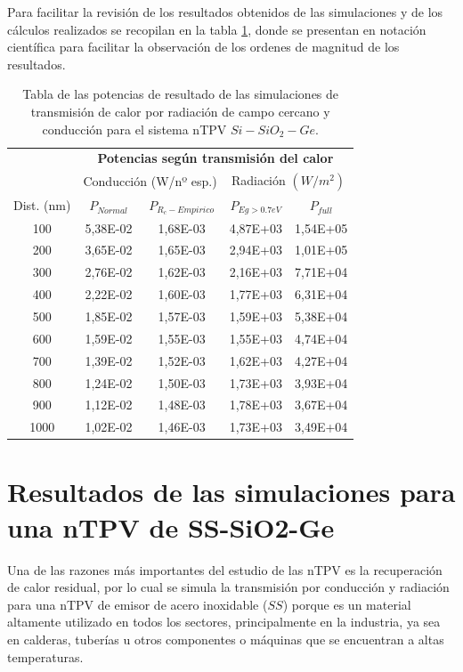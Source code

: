 Para facilitar la revisión de los resultados obtenidos de las simulaciones y de los cálculos realizados se recopilan en la tabla \ref{tab:SiSiO2Ge}, donde se presentan en notación científica para facilitar la observación de los ordenes de magnitud de los resultados.
\begin{table}[H]
	\centering
	\caption{Tabla de las potencias de resultado de las simulaciones de transmisión de calor por radiación de campo cercano y conducción para el sistema nTPV $Si-SiO_2-Ge$.}	
		\begin{tabular}{|c||c|c||c|c|}
		\hline
\multirow{2}{*}{ }& \multicolumn{4}{c|}{\textbf{\large Potencias según transmisión del calor}}\\ \cline{2-5}
& \multicolumn{2}{c||}{Conducción (W/nº esp.)}& \multicolumn{2}{c|}{Radiación $(W/m^2)$}\\ \hline
Dist. (nm)&$P_{Normal}$&$P_{R_c-Empirico}$&$P_{Eg>0.7eV}$&$P_{full}$\\ \hline \hline
100&5,38E-02&1,68E-03&4,87E+03&1,54E+05\\ \hline 
200&3,65E-02&1,65E-03&2,94E+03&1,01E+05\\ \hline 
300&2,76E-02&1,62E-03&2,16E+03&7,71E+04\\ \hline 
400&2,22E-02&1,60E-03&1,77E+03&6,31E+04\\ \hline 
500&1,85E-02&1,57E-03&1,59E+03&5,38E+04\\ \hline 
600&1,59E-02&1,55E-03&1,55E+03&4,74E+04\\ \hline 
700&1,39E-02&1,52E-03&1,62E+03&4,27E+04\\ \hline 
800&1,24E-02&1,50E-03&1,73E+03&3,93E+04\\ \hline 
900&1,12E-02&1,48E-03&1,78E+03&3,67E+04\\ \hline 
1000&1,02E-02&1,46E-03&1,73E+03&3,49E+04\\ \hline 
		\end{tabular}
	\label{tab:SiSiO2Ge}
\end{table}
\vfill
\newpage
\section{Resultados de las simulaciones para una nTPV de SS-SiO2-Ge}\label{sec:res_SsSiO2Ge}
Una de las razones más importantes del estudio de las nTPV es la recuperación de calor residual, por lo cual se simula la transmisión por conducción y radiación para una nTPV de emisor de acero inoxidable ($SS$) porque es un material altamente utilizado en todos los sectores, principalmente en la industria, ya sea en calderas, tuberías u otros componentes o máquinas que se encuentran a altas temperaturas.
